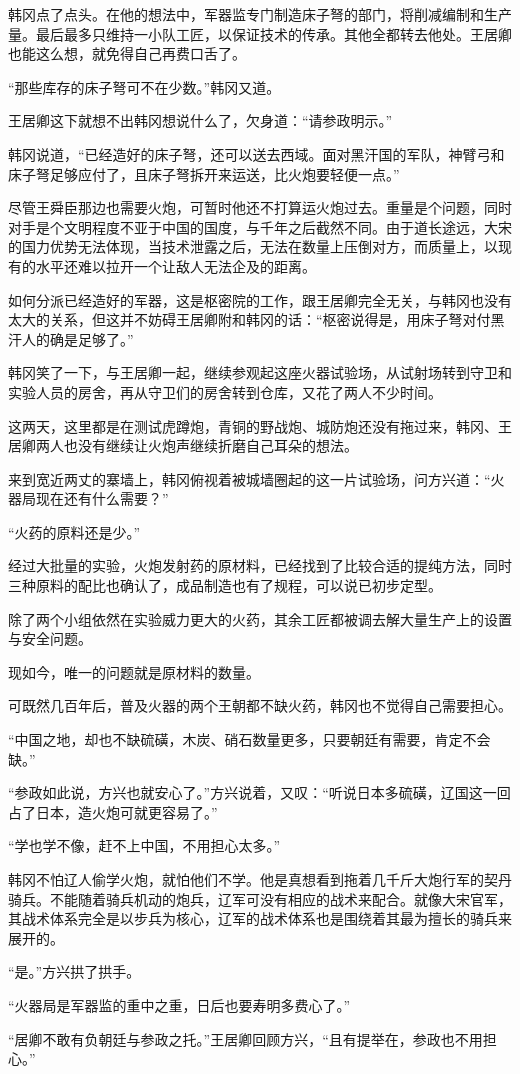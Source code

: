 韩冈点了点头。在他的想法中，军器监专门制造床子弩的部门，将削减编制和生产量。最后最多只维持一小队工匠，以保证技术的传承。其他全都转去他处。王居卿也能这么想，就免得自己再费口舌了。

“那些库存的床子弩可不在少数。”韩冈又道。

王居卿这下就想不出韩冈想说什么了，欠身道：“请参政明示。”

韩冈说道，“已经造好的床子弩，还可以送去西域。面对黑汗国的军队，神臂弓和床子弩足够应付了，且床子弩拆开来运送，比火炮要轻便一点。”

尽管王舜臣那边也需要火炮，可暂时他还不打算运火炮过去。重量是个问题，同时对手是个文明程度不亚于中国的国度，与千年之后截然不同。由于道长途远，大宋的国力优势无法体现，当技术泄露之后，无法在数量上压倒对方，而质量上，以现有的水平还难以拉开一个让敌人无法企及的距离。

如何分派已经造好的军器，这是枢密院的工作，跟王居卿完全无关，与韩冈也没有太大的关系，但这并不妨碍王居卿附和韩冈的话：“枢密说得是，用床子弩对付黑汗人的确是足够了。”

韩冈笑了一下，与王居卿一起，继续参观起这座火器试验场，从试射场转到守卫和实验人员的房舍，再从守卫们的房舍转到仓库，又花了两人不少时间。

这两天，这里都是在测试虎蹲炮，青铜的野战炮、城防炮还没有拖过来，韩冈、王居卿两人也没有继续让火炮声继续折磨自己耳朵的想法。

来到宽近两丈的寨墙上，韩冈俯视着被城墙圈起的这一片试验场，问方兴道：“火器局现在还有什么需要？”

“火药的原料还是少。”

经过大批量的实验，火炮发射药的原材料，已经找到了比较合适的提纯方法，同时三种原料的配比也确认了，成品制造也有了规程，可以说已初步定型。

除了两个小组依然在实验威力更大的火药，其余工匠都被调去解大量生产上的设置与安全问题。

现如今，唯一的问题就是原材料的数量。

可既然几百年后，普及火器的两个王朝都不缺火药，韩冈也不觉得自己需要担心。

“中国之地，却也不缺硫磺，木炭、硝石数量更多，只要朝廷有需要，肯定不会缺。”

“参政如此说，方兴也就安心了。”方兴说着，又叹：“听说日本多硫磺，辽国这一回占了日本，造火炮可就更容易了。”

“学也学不像，赶不上中国，不用担心太多。”

韩冈不怕辽人偷学火炮，就怕他们不学。他是真想看到拖着几千斤大炮行军的契丹骑兵。不能随着骑兵机动的炮兵，辽军可没有相应的战术来配合。就像大宋官军，其战术体系完全是以步兵为核心，辽军的战术体系也是围绕着其最为擅长的骑兵来展开的。

“是。”方兴拱了拱手。

“火器局是军器监的重中之重，日后也要寿明多费心了。”

“居卿不敢有负朝廷与参政之托。”王居卿回顾方兴，“且有提举在，参政也不用担心。”

